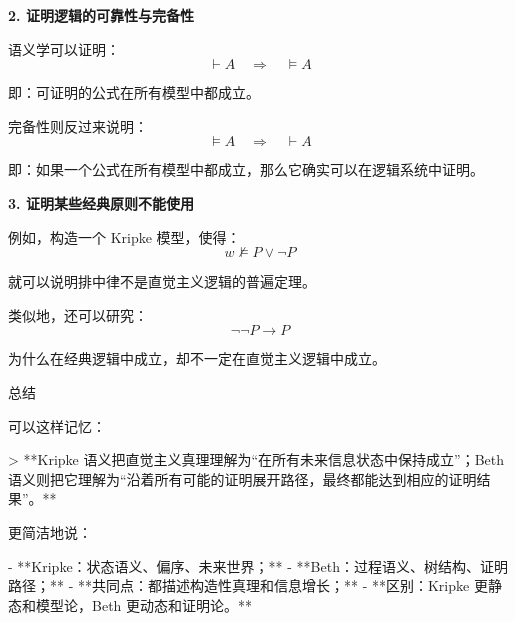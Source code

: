 \documentclass{beamer}
\begin{document}
\begin{frame}[fragile]
\begin{markdown}
\textbf{2. 证明逻辑的可靠性与完备性}

语义学可以证明：
$$
\vdash A \quad\Longrightarrow\quad \models A
$$

即：可证明的公式在所有模型中都成立。

完备性则反过来说明：
$$
\models A \quad\Longrightarrow\quad \vdash A
$$

即：如果一个公式在所有模型中都成立，那么它确实可以在逻辑系统中证明。
\end{markdown}
\end{frame}

\begin{frame}[fragile]
\begin{markdown}
\textbf{3. 证明某些经典原则不能使用}

例如，构造一个 Kripke 模型，使得：
$$
w\not\models P\lor\neg P
$$

就可以说明排中律不是直觉主义逻辑的普遍定理。

类似地，还可以研究：
$$
\neg\neg P\to P
$$

为什么在经典逻辑中成立，却不一定在直觉主义逻辑中成立。
\end{markdown}
\end{frame}

\begin{frame}[fragile]{总结}
\begin{markdown}
可以这样记忆：

> **Kripke 语义把直觉主义真理理解为“在所有未来信息状态中保持成立”；Beth 语义则把它理解为“沿着所有可能的证明展开路径，最终都能达到相应的证明结果”。**

更简洁地说：

- **Kripke：状态语义、偏序、未来世界；**
- **Beth：过程语义、树结构、证明路径；**
- **共同点：都描述构造性真理和信息增长；**
- **区别：Kripke 更静态和模型论，Beth 更动态和证明论。**
\end{markdown}
\end{frame}
\end{document}
